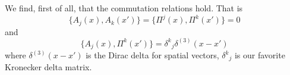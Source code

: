 We find, first of all, that the commutation relations hold. That
is
\begin{equation}%
\{A_{j}(x),A_{k}(x')\}=\{\Pi^{j}(x),\Pi^{k}(x')\}=0
\end{equation}
and
\begin{equation}%
\{A_{j}(x),\Pi^{k}(x')\} = {\delta^{k}}_{j}\delta^{(3)}(x-x')
\end{equation}
where $\delta^{(3)}(x-x')$ is the Dirac delta for spatial
vectors, ${\delta^{k}}_{j}$ is our favorite Kronecker delta matrix.

\begin{comment}
Now there are 5 interesting combinations we can look at, but we
don't want to look at combinations involving the Hamiltonian
right away. That leaves merely 2 combinations. One is the Poisson
bracket of $A_{j}$ with $B_{l}$, the other is $\Pi^{k}$ with $B_{l}$.
We see that 
\begin{subequations}
\begin{align}
\{A_{m}(x),B_{i}(x')\} &=
\varepsilon_{ijk}\{A_{m}(x),\partial^{j}A^{k}(x')\}\\
&= \varepsilon_{ijk}\int\left({\delta_{m}}^{n}\delta^{(3)}(y-x)\frac{\delta\partial^{j}A^{k}(x')}{\delta\Pi^{n}(y)}\right)d^{3}x\\
&= \varepsilon_{ijk}\int\left({\delta_{m}}^{n}\delta^{(3)}(y-x)\partial^{j}\frac{\delta
  A^{k}(x')}{\delta\Pi^{n}(y)}\right)d^{3}x\\
&= 0.
\end{align}
\end{subequations}
Well\ldots that was anticlimactic.


\end{comment}
